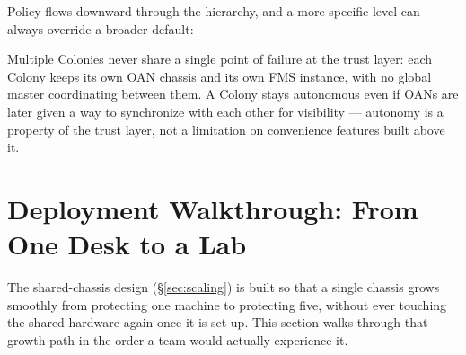 \documentclass[11pt,a4paper]{article}
\begin{document}
Policy flows downward through the hierarchy, and a more specific level
can always override a broader default:

\begin{center}
\end{center}

Multiple Colonies never share a single point of failure at the trust
layer: each Colony keeps its own OAN chassis and its own FMS instance,
with no global master coordinating between them. A Colony stays
autonomous even if OANs are later given a way to synchronize with each
other for visibility --- autonomy is a property of the trust layer, not
a limitation on convenience features built above it.

\section{Deployment Walkthrough: From One Desk to a Lab}
\label{sec:walkthrough}

The shared-chassis design (\S\ref{sec:scaling}) is built so that a
single chassis grows smoothly from protecting one machine to protecting
five, without ever touching the shared hardware again once it is set
up. This section walks through that growth path in the order a team
would actually experience it.
\end{document}
